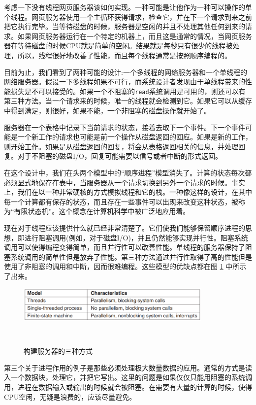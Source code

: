 	考虑一下没有线程网页服务器该如何实现。一种可能是让他作为一种可以操作的单个线程。网页服务器使用一个主循环获得请求，检查它，并在下一个请求到来之前把它执行完毕。当等待磁盘的时候，服务器是空闲的并且不处理其他任何到来的请求。如果网页服务器运行在一个特定的机器上，而且这是通常的情况，当网页服务器在等待磁盘的时候CPU就是简单的空闲。结果就是每秒只有很少的线程被处理，所以，线程很好地改善了性能，而且每个线程通常是按照顺序编程的。
	
	目前为止，我们看到了两种可能的设计:一个多线程的网络服务器和一个单线程的网络服务器。假设一下多线程如果不可行，而系统设计者发现由于单线程带来的性能损失是不可以接受的。如果一个不阻塞的\texttt{read}系统调用是可用的，则还可以有第三种方法。当一个请求来的时候，唯一的线程就会检测到它。如果它可以从缓存中得到满足，则很好，如果不能，一个非阻塞的磁盘操作就开始了。
	
	服务器在一个表格中记录下当前请求的状态，接着去取下一个事件。下一个事件可能是一个新工作的请求也可能是前一个操作从磁盘返回的回应。如果是新的工作，则开始工作。如果是从磁盘返回的回复，将会从表格返回相关的信息，并处理回复。对于不阻塞的磁盘I/O，回复可能需要以信号或者中断的形式返回。
	
	在这个设计中，我们在头两个模型中的“顺序进程”模型消失了。计算的状态每次都必须显式地保存在表中，当服务器从一个请求切换到另外一个请求的时候。事实上，我们在以一种非常硬核的方式模拟线程和它的栈。一种像这样的设计，在其中每一个计算都有保存的状态，而且存在一些事件可以出现来改变这种状态，被称为“有限状态机”。这个概念在计算机科学中被广泛地应用着。
	
	现在对于线程应该提供什么就已经非常清楚了。它们使我们能够保留顺序进程的思想，即进行阻塞调用(例如，对于磁盘I/O)，并且仍然能够实现并行性。阻塞系统调用可以使得编程变得简单，而且并行性可以改善性能。单线程的服务器保持了阻塞系统调用的简单性但是放弃了性能。第三种方法通过并行性取得了高的性能但是使用了非阻塞的调用和中断，因而很难编程。这些模型的优缺点都在图 \ref{fig:threeways} 中所示了出来。
	
	\begin{figure}[ht]\small
		\centering
		\includegraphics[width=0.85\textwidth]{FIG/2-10.png}
		\caption{构建服务器的三种方式}　\label{fig:threeways}
	\end{figure}
	
	第三个关于进程作用的例子是那些必须处理极大数量数据的应用。通常的方式是读入一个数据块，处理它，并把它写出。这里的问题是如果仅仅只能用阻塞的系统调用，进程在数据输入或输出的时候就会被阻塞。在需要有大量的计算的时候，使得CPU空闲，无疑是浪费的，应该尽量避免。
	
